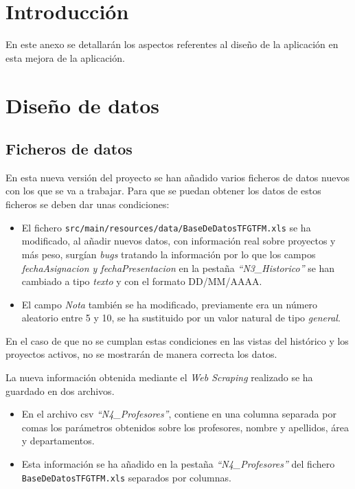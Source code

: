 
\section{Introducción}
En este anexo se detallarán los aspectos referentes al diseño de la aplicación en esta mejora de la aplicación.

\section{Diseño de datos}

\subsection{Ficheros de datos}

En esta nueva versión del proyecto se han añadido varios ficheros de datos nuevos con los que se va a trabajar. Para que se puedan obtener los datos de estos ficheros se deben dar unas condiciones:

\begin{itemize}
	\item El fichero \texttt{src/main/resources/data/BaseDeDatosTFGTFM.xls} se ha modificado, al añadir nuevos datos, con información real sobre proyectos y más peso, surgían \emph{bugs} tratando la información por lo que los campos \emph{fechaAsignacion y fechaPresentacion} en la pestaña \emph{``N3\_Historico''} se han cambiado a tipo \emph{texto} y con el formato DD/MM/AAAA.
	\item El campo \emph{Nota} también se ha modificado, previamente era un número aleatorio entre 5 y 10, se ha sustituido por un valor natural de tipo \emph{general}.
\end{itemize}

En el caso de que no se cumplan estas condiciones en las vistas del histórico
y los proyectos activos, no se mostrarán de manera correcta los datos.

La nueva información obtenida mediante el \emph{Web Scraping} realizado se ha guardado en dos archivos.
\begin{itemize}
	\item En el archivo csv \emph{``N4\_Profesores''}, contiene en una columna separada por comas los parámetros obtenidos sobre los profesores, nombre y apellidos, área y departamentos.
	\item Esta información se ha añadido en la pestaña \emph{``N4\_Profesores''} del fichero \texttt{BaseDeDatosTFGTFM.xls} separados por columnas.
\end{itemize}

